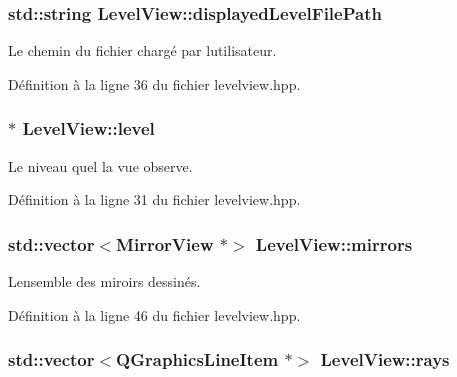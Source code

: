 \subsubsection[{displayed\+Level\+File\+Path}]{\setlength{\rightskip}{0pt plus 5cm}std\+::string Level\+View\+::displayed\+Level\+File\+Path\hspace{0.3cm}{\ttfamily [private]}}\label{classLevelView_a826d9224c5bbbecb5c02b7734d0b8137}


Le chemin du fichier chargé par l\textquotesingle{}utilisateur. 



Définition à la ligne 36 du fichier levelview.\+hpp.

\hypertarget{classLevelView_ab51fb77e921a425c79b9671ebb8718e2}{}
\subsubsection[{level}]{$\ast$ Level\+View\+::level\hspace{0.3cm}{\ttfamily [private]}}\label{classLevelView_ab51fb77e921a425c79b9671ebb8718e2}


Le niveau quel la vue observe. 



Définition à la ligne 31 du fichier levelview.\+hpp.

\hypertarget{classLevelView_ad530e6ab8704e9201efe04bf98ff44e9}{}
\subsubsection[{mirrors}]{\setlength{\rightskip}{0pt plus 5cm}std\+::vector$<${\bf Mirror\+View} $\ast$$>$ Level\+View\+::mirrors\hspace{0.3cm}{\ttfamily [private]}}\label{classLevelView_ad530e6ab8704e9201efe04bf98ff44e9}


L\textquotesingle{}ensemble des miroirs dessinés. 



Définition à la ligne 46 du fichier levelview.\+hpp.

\hypertarget{classLevelView_a79c31b19d94522a4756bcf0bbae0c1a1}{}
\subsubsection[{rays}]{\setlength{\rightskip}{0pt plus 5cm}std\+::vector$<$Q\+Graphics\+Line\+Item $\ast$$>$ Level\+View\+::rays\hspace{0.3cm}{\ttfamily [private]}}\label{classLevelView_a79c31b19d94522a4756bcf0bbae0c1a1}


